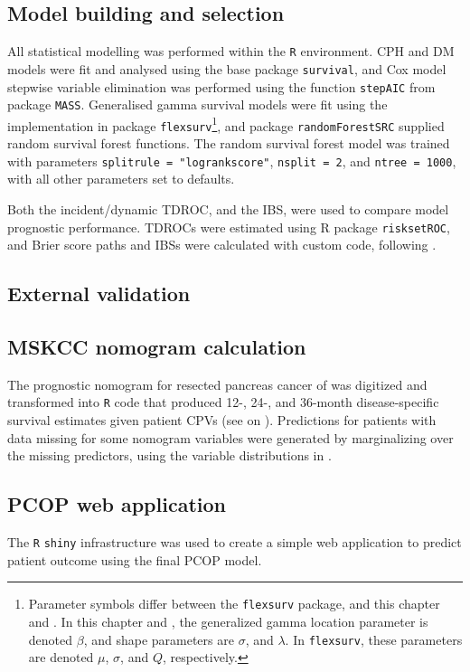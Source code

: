 \documentclass[dissertation.tex]{subfiles}
\begin{document}
\subsection{Model building and selection}
All statistical modelling was performed within the \texttt{R} environment.  \gls{CPH} and \gls{DM} models were fit and analysed using the base package \texttt{survival}, and Cox model stepwise variable elimination was performed using the function \texttt{stepAIC} from package \texttt{MASS}.  Generalised gamma survival models were fit using the implementation in package \texttt{flexsurv}\footnote{Parameter symbols differ between the \texttt{flexsurv} package, and this chapter and \cite{Cox2007}.  In this chapter and \cite{Cox2007}, the generalized gamma location parameter is denoted $\beta$, and shape parameters are $\sigma$, and $\lambda$.  In \texttt{flexsurv}, these parameters are denoted $\mu$, $\sigma$, and $Q$, respectively.}, and package \texttt{randomForestSRC} supplied random survival forest functions.  The random survival forest model was trained with parameters \texttt{splitrule = "logrankscore"}, \texttt{nsplit = 2}, and \texttt{ntree = 1000}, with all other parameters set to defaults.

Both the incident/dynamic \gls{TDROC}, and the \gls{IBS}, were used to compare model prognostic performance.  \glspl{TDROC} were estimated using R package \texttt{risksetROC}, and Brier score paths and \glspl{IBS} were calculated with custom code, following \cite{Graf1999}.

\subsection{External validation}


\subsection{MSKCC nomogram calculation}
The prognostic nomogram for resected pancreas cancer of \cite{Brennan2004} was digitized and transformed into \texttt{R} code that produced 12-, 24-, and 36-month disease-specific survival estimates given patient \glspl{CPV} (see  on ).  Predictions for patients with data missing for some nomogram variables were generated by marginalizing over the missing predictors, using the variable distributions in \cite{Brennan2004}.

\subsection{PCOP web application}
The \texttt{R} \texttt{shiny} infrastructure was used to create a simple web application to predict patient outcome using the final \gls{PCOP} model.
\end{document}
